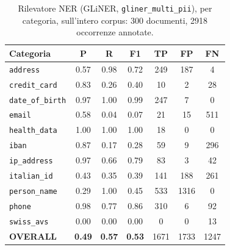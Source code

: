 \begin{table}
	\centering
	\caption{Rilevatore NER (GLiNER, \texttt{gliner\_multi\_pii}), per categoria, sull'intero corpus: 300 documenti, 2918 occorrenze annotate.}
	\label{tab:test-ner}
	\small
	\begin{tabular}{|l|c|c|c|c|c|c|}
		\hline
		\textbf{Categoria}       & \textbf{P}    & \textbf{R}    & \textbf{F1}   & \textbf{TP} & \textbf{FP} & \textbf{FN} \\
		\hline
		\texttt{address}         & 0.57          & 0.98          & 0.72          & 249         & 187         & 4           \\
		\hline
		\texttt{credit\_card}    & 0.83          & 0.26          & 0.40          & 10          & 2           & 28          \\
		\hline
		\texttt{date\_of\_birth} & 0.97          & 1.00          & 0.99          & 247         & 7           & 0           \\
		\hline
		\texttt{email}           & 0.58          & 0.04          & 0.07          & 21          & 15          & 511         \\
		\hline
		\texttt{health\_data}    & 1.00          & 1.00          & 1.00          & 18          & 0           & 0           \\
		\hline
		\texttt{iban}            & 0.87          & 0.17          & 0.28          & 59          & 9           & 296         \\
		\hline
		\texttt{ip\_address}     & 0.97          & 0.66          & 0.79          & 83          & 3           & 42          \\
		\hline
		\texttt{italian\_id}     & 0.43          & 0.35          & 0.39          & 141         & 188         & 261         \\
		\hline
		\texttt{person\_name}    & 0.29          & 1.00          & 0.45          & 533         & 1316        & 0           \\
		\hline
		\texttt{phone}           & 0.98          & 0.77          & 0.86          & 310         & 6           & 92          \\
		\hline
		\texttt{swiss\_avs}      & 0.00          & 0.00          & 0.00          & 0           & 0           & 13          \\
		\hline
		\textbf{OVERALL}         & \textbf{0.49} & \textbf{0.57} & \textbf{0.53} & 1671        & 1733        & 1247        \\
		\hline
	\end{tabular}
\end{table}

